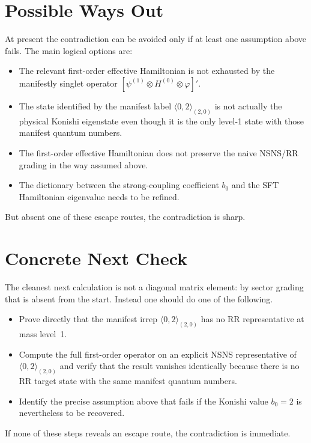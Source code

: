 \documentclass[12pt]{article}
\newcommand{\la}{\langle}
\newcommand{\ra}{\rangle}
\begin{document}
\section{Possible Ways Out}

At present the contradiction can be avoided only if at least one assumption above fails.
The main logical options are:
\begin{itemize}
\item The relevant first-order effective Hamiltonian is not exhausted by the manifestly singlet operator
$[\psi^{(1)}\otimes H^{(0)}\otimes\varphi]'$.
\item The state identified by the manifest label $\la 0,2\ra_{(2,0)}$ is not actually the physical
Konishi eigenstate even though it is the only level-1 state with those manifest quantum numbers.
\item The first-order effective Hamiltonian does not preserve the naive NSNS/RR grading in the way assumed
above.
\item The dictionary between the strong-coupling coefficient $b_0$ and the SFT Hamiltonian eigenvalue needs
to be refined.
\end{itemize}

But absent one of these escape routes, the contradiction is sharp.

\section{Concrete Next Check}

The cleanest next calculation is not a diagonal matrix element: by sector grading that is absent from the
start.  Instead one should do one of the following.
\begin{itemize}
\item Prove directly that the manifest irrep $\la 0,2\ra_{(2,0)}$ has no RR representative at mass level~1.
\item Compute the full first-order operator on an explicit NSNS representative of
$\la 0,2\ra_{(2,0)}$ and verify that the result vanishes identically because there is no RR target state with
the same manifest quantum numbers.
\item Identify the precise assumption above that fails if the Konishi value $b_0=2$ is nevertheless to be
recovered.
\end{itemize}

If none of these steps reveals an escape route, the contradiction is immediate.
\end{document}
